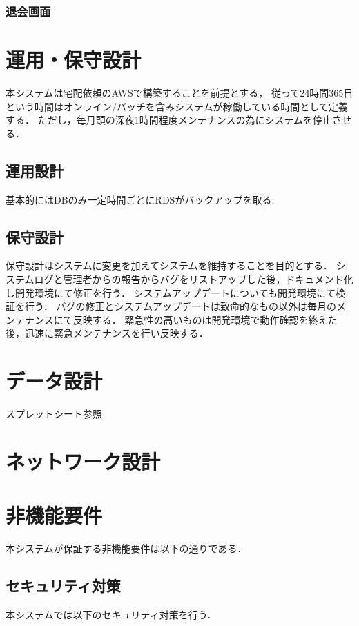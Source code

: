 \documentclass[a4paper, titlepage]{jsarticle}
\begin{document}
\subsubsection{退会画面}

\section{運用・保守設計}
本システムは宅配依頼のAWSで構築することを前提とする，
従って24時間365日という時間はオンライン/バッチを含みシステムが稼働している時間として定義する．
ただし，毎月頭の深夜1時間程度メンテナンスの為にシステムを停止させる．
\subsection{運用設計}
基本的にはDBのみ一定時間ごとにRDSがバックアップを取る.

\subsection{保守設計}
保守設計はシステムに変更を加えてシステムを維持することを目的とする．
システムログと管理者からの報告からバグをリストアップした後，ドキュメント化し開発環境にて修正を行う．
システムアップデートについても開発環境にて検証を行う．
バグの修正とシステムアップデートは致命的なもの以外は毎月のメンテナンスにて反映する．
緊急性の高いものは開発環境で動作確認を終えた後，迅速に緊急メンテナンスを行い反映する．
\section{データ設計}
スプレットシート参照
\section{ネットワーク設計}

\section{非機能要件}
本システムが保証する非機能要件は以下の通りである．
\subsection{セキュリティ対策}
本システムでは以下のセキュリティ対策を行う．
\end{document}
